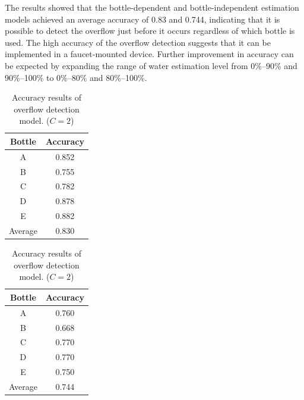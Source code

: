 \documentclass[sigconf]{acmart}
\begin{document}
The results showed that the bottle-dependent and bottle-independent estimation models achieved an average accuracy of 0.83 and 0.744, indicating that it is possible to detect the overflow just before it occurs regardless of which bottle is used. The high accuracy of the overflow detection suggests that it can be implemented in a faucet-mounted device. Further improvement in accuracy can be expected by expanding the range of water estimation level from 0\%--90\% and 90\%--100\% to 0\%--80\% and 80\%--100\%.

\begin{table}[!t]
  \small
  \centering
  \caption{Accuracy results of overflow detection model. ($C=2$)}
  \begin{minipage}[t]{0.45\linewidth}
    \centering
    \begin{tabular}{c|c} \hline\hline
    Bottle & Accuracy \\ \hline
    A & 0.852 \\
    B & 0.755 \\
    C & 0.782 \\
    D & 0.878 \\
    E & 0.882 \\ \hline
    Average & 0.830 \\ \hline
    \end{tabular}
    \label{tab:result_2_dependent}
  \end{minipage}
  \begin{minipage}[t]{0.45\linewidth}
    \centering
    \begin{tabular}{c|c} \hline\hline
    Bottle & Accuracy \\ \hline
    A & 0.760 \\
    B & 0.668 \\
    C & 0.770 \\
    D & 0.770 \\
    E & 0.750 \\ \hline
    Average & 0.744 \\ \hline
    \end{tabular}
    \label{tab:result_2_independent}
  \end{minipage}
  \label{tab:result_2}
\end{table}



\end{document}
